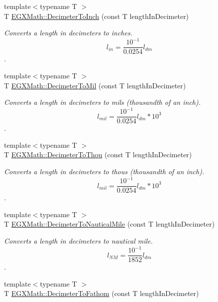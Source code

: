 \begin{DoxyCompactItemize}
{\footnotesize template$<$typename T $>$ }\\T \mbox{\hyperlink{group___e_g_x_math-_conversions-_length_conversions-_s_i-_decimeter-_imperial_ga51bb6347b1c3ca746b7a3eadc3852e37}{E\+G\+X\+Math\+::\+Decimeter\+To\+Inch}} (const T length\+In\+Decimeter)
\begin{DoxyCompactList}\small\item\em Converts a length in decimeters to inches. \[ l_{in}= \frac{10^{-1}}{0.0254} l_{dm} \]. \end{DoxyCompactList}\item 
{\footnotesize template$<$typename T $>$ }\\T \mbox{\hyperlink{group___e_g_x_math-_conversions-_length_conversions-_s_i-_decimeter-_imperial_gad2ce3f2de1fdda0216bdb56c4844b5e5}{E\+G\+X\+Math\+::\+Decimeter\+To\+Mil}} (const T length\+In\+Decimeter)
\begin{DoxyCompactList}\small\item\em Converts a length in decimeters to mils (thousandth of an inch). \[ l_{mil}= \frac{10^{-1}}{0.0254} l_{dm} * 10^{3} \]. \end{DoxyCompactList}\item 
{\footnotesize template$<$typename T $>$ }\\T \mbox{\hyperlink{group___e_g_x_math-_conversions-_length_conversions-_s_i-_decimeter-_imperial_gafc294e549fcdd1c43545ca9624abcafb}{E\+G\+X\+Math\+::\+Decimeter\+To\+Thou}} (const T length\+In\+Decimeter)
\begin{DoxyCompactList}\small\item\em Converts a length in decimeters to thous (thousandth of an inch). \[ l_{mil}= \frac{10^{-1}}{0.0254} l_{dm} * 10^{3} \]. \end{DoxyCompactList}\item 
{\footnotesize template$<$typename T $>$ }\\T \mbox{\hyperlink{group___e_g_x_math-_conversions-_length_conversions-_s_i-_decimeter-_nautical_ga6cc0e9987da30da6a30ddba50971ba2d}{E\+G\+X\+Math\+::\+Decimeter\+To\+Nautical\+Mile}} (const T length\+In\+Decimeter)
\begin{DoxyCompactList}\small\item\em Converts a length in decimeters to nautical mile. \[ l_{NM}= \frac{10^{-1}}{1852} l_{dm} \]. \end{DoxyCompactList}\item 
{\footnotesize template$<$typename T $>$ }\\T \mbox{\hyperlink{group___e_g_x_math-_conversions-_length_conversions-_s_i-_decimeter-_nautical_ga1b0035d719274942290afe80600a2b27}{E\+G\+X\+Math\+::\+Decimeter\+To\+Fathom}} (const T length\+In\+Decimeter)

\end{DoxyCompactItemize}
